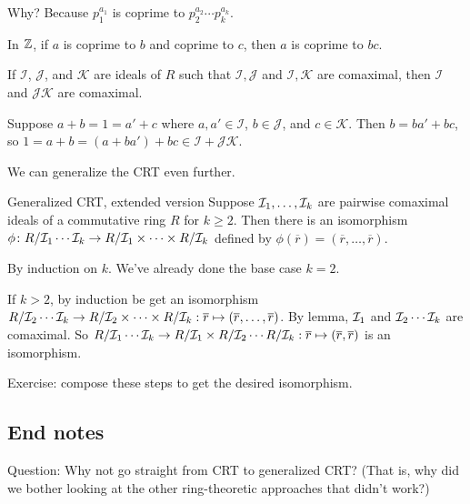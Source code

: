 \documentclass[12pt,letterpaper]{report}
\begin{document}
Why?
Because $p_1^{a_1}$ is coprime to $p_2^{a_2} \cdots p_k^{a_k}$.

In $\mathbb{Z}$, if $a$ is coprime to $b$ and coprime to $c$, then $a$ is coprime to $bc$.

\begin{lem}{}{}
  If $\mathcal{I}$, $\mathcal{J}$, and $\mathcal{K}$ are ideals of $R$ such that
  $\mathcal{I}, \mathcal{J}$ and $\mathcal{I}, \mathcal{K}$ are comaximal, then $\mathcal{I}$ and
  $\mathcal{JK}$ are comaximal.
\end{lem}

\begin{thmproof}
  Suppose $a + b = 1 = a' + c$ where $a, a' \in \mathcal{I}$, $b \in \mathcal{J}$, and
  $c \in \mathcal{K}$.
  Then $b = ba' + bc$, so $1 = a + b = (a + ba') + bc \in \mathcal{I} + \mathcal{JK}$.
\end{thmproof}

We can generalize the CRT even further.

\begin{thm}{Generalized CRT, extended version}{}
  Suppose $\mathcal{I}_1, \ldots, \mathcal{I}_k$ are pairwise comaximal ideals of a commutative ring $R$ for
  $k \geq 2$.
  Then there is an isomorphism
  $\phi \colon R/\mathcal{I}_1 \cdots \mathcal{I}_k \to R/\mathcal{I}_1 \times \cdots \times R/\mathcal{I}_k$ defined by
  $\phi(\overline{r}) = (\overline{r}, \ldots, \overline{r})$.
\end{thm}

\begin{thmproof}
  By induction on $k$.
  We've already done the base case $k = 2$.

  If $k > 2$, by induction be get an isomorphism
  $R/\mathcal{I}_2 \cdots \mathcal{I}_k \to R/\mathcal{I}_2 \times \cdots \times R/\mathcal{I}_k :
    \overline{r} \mapsto (\overline{r}, \ldots, \overline{r})$.
  By lemma, $\mathcal{I}_1$ and $\mathcal{I}_2 \cdots \mathcal{I}_k$ are comaximal.
  So $R/\mathcal{I}_1 \cdots \mathcal{I}_k \to R/\mathcal{I}_1 \times R/\mathcal{I}_2 \cdots R/\mathcal{I}_k :
    \overline{r} \mapsto (\overline{r}, \overline{r})$ is an isomorphism.

  Exercise: compose these steps to get the desired isomorphism.
\end{thmproof}

\pagebreak
\subsection{End notes}

Question: Why not go straight from CRT to generalized CRT?
(That is, why did we bother looking at the other ring-theoretic approaches that didn't work?)
\end{document}
